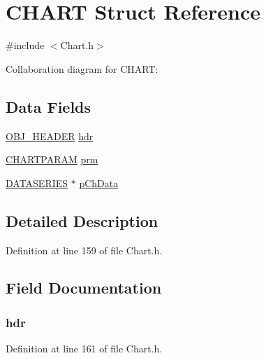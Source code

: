 \hypertarget{struct_c_h_a_r_t}{}\section{C\+H\+A\+R\+T Struct Reference}
\label{struct_c_h_a_r_t}


{\ttfamily \#include $<$Chart.\+h$>$}



Collaboration diagram for C\+H\+A\+R\+T\+:
\subsection*{Data Fields}
\begin{DoxyCompactItemize}
\item 
\hyperlink{struct_o_b_j___h_e_a_d_e_r}{O\+B\+J\+\_\+\+H\+E\+A\+D\+E\+R} \hyperlink{struct_c_h_a_r_t_abeffaf353197a8a64fba6707b68ce0be}{hdr}
\item 
\hyperlink{struct_c_h_a_r_t_p_a_r_a_m}{C\+H\+A\+R\+T\+P\+A\+R\+A\+M} \hyperlink{struct_c_h_a_r_t_a280931f1f217395d6a69cc538a5e9cc1}{prm}
\item 
\hyperlink{struct_d_a_t_a_s_e_r_i_e_s}{D\+A\+T\+A\+S\+E\+R\+I\+E\+S} $\ast$ \hyperlink{struct_c_h_a_r_t_aadacc722a60920a882557521f354d44a}{p\+Ch\+Data}
\end{DoxyCompactItemize}


\subsection{Detailed Description}


Definition at line 159 of file Chart.\+h.



\subsection{Field Documentation}
\hypertarget{struct_c_h_a_r_t_abeffaf353197a8a64fba6707b68ce0be}{}
\subsubsection[{hdr}]{ hdr}\label{struct_c_h_a_r_t_abeffaf353197a8a64fba6707b68ce0be}


Definition at line 161 of file Chart.\+h.

\hypertarget{struct_c_h_a_r_t_aadacc722a60920a882557521f354d44a}{}
